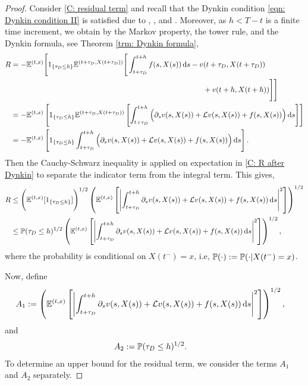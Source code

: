 \begin{proof}
    Consider \eqref{C: residual term} and recall that the Dynkin condition \eqref{eqn: Dynkin condition II} is satisfied due to , , and . Moreover, as $h<T-t$ is a finite time increment, we obtain by the Markov property, the tower rule, and the Dynkin formula, see Theorem \ref{trm: Dynkin formula}, 
    \begin{align}
        R &= -\mathbb{E}^{(t,x)} \Bigg[1_{\left\{\tau_D \leq h\right\}} \mathbb{E}^{(t+\tau_D,X(t+\tau_D))} \Bigg[ \int_{t+\tau_D}^{t+h} f(s,X(s)) \,\mathrm{d} s - v(t+\tau_D, X(t+\tau_D)) \nonumber \\
        & \qquad \qquad \qquad \qquad  \qquad \qquad  \qquad \qquad  \qquad \qquad  \qquad \qquad  \qquad + v(t+h,X(t+h)) \Bigg] \Bigg] \nonumber\\
        &= -\mathbb{E}^{(t,x)} \left[1_{\left\{\tau_D \leq h\right\}} \mathbb{E}^{(t+\tau_D,X(t+\tau_D))} \left[ \int_{t+\tau_D}^{t+h} \Big(\partial_sv(s,X(s)) +\mathcal{L} v(s,X(s)) + f(s,X(s)) \Big) \,\mathrm{d} s\right] \right] \nonumber\\
        &= -\mathbb{E}^{(t,x)} \left[1_{\left\{\tau_D \leq h\right\}} \int_{t+\tau_D}^{t+h} \Big(\partial_sv(s,X(s)) +\mathcal{L} v(s,X(s)) + f(s,X(s)) \Big) \,\mathrm{d} s \right].
        \label{C: R after Dynkin}
    \end{align}
    Then the Cauchy-Schwarz inequality is applied on expectation in \eqref{C: R after Dynkin} to separate the indicator term from the  integral term. This gives,
    \begin{align}
        R &\leq \Bigg(\mathbb{E}^{(t,x)} [1_{\left\{\tau_D \leq h\right\}}]\Bigg)^{1/2} \left(\mathbb{E}^{(t,x)} \left[ \left| \int_{t+\tau_D}^{t+h} \partial_s v(s, X(s)) + \mathcal{L} v(s,X(s)) + f(s,X(s)) \,\mathrm{d} s \right|^2 \right]\right)^{1/2}
        \nonumber \\
        &\leq \mathbb{P} (\tau_D \leq h)^{1/2} \left(\mathbb{E}^{(t,x)} \left[ \left| \int_{t+\tau_D}^{t+h} \partial_s v(s, X(s)) + \mathcal{L} v(s,X(s)) + f(s,X(s)) \,\mathrm{d} s \right|^2 \right]\right)^{1/2}, \label{eqn: R inequality}
    \end{align}
    where the probability is conditional on $X(t^-)=x$, i.e, $\mathbb{P}(\cdot):= \mathbb{P} (\cdot | X(t^-)=x)$. 

    Now, define 
    \begin{align*}
        A_1 &:= \left(\mathbb{E}^{(t,x)} \left[ \left| \int_{t+\tau_D}^{t+h} \partial_s v(s, X(s)) + \mathcal{L} v(s,X(s)) + f(s,X(s)) \,\mathrm{d} s \right|^2 \right]\right)^{1/2}, 
    \end{align*}
    and
    \begin{align*}
        A_2 &:= \mathbb{P} (\tau_D \leq h)^{1/2}.
    \end{align*}
    To determine an upper bound for the residual term, we consider the terms $A_1$ and $A_2$ separately. 


\end{proof}
